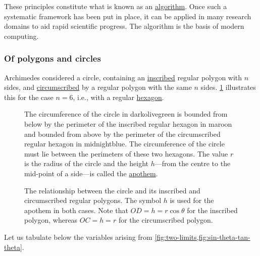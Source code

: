 \documentclass[
  a4paper,
]{article}
\begin{document}
These principles constitute what is known as an
\href{https://www.merriam-webster.com/dictionary/algorithm}{algorithm}.
Once such a systematic framework has been put in place, it can be
applied in many research domains to aid rapid scientific progress. The
algorithm is the basis of modern computing.

\subsubsection{Of polygons and circles}\label{of-polygons-and-circles}

Archimedes considered a circle, containing an
\href{https://mathworld.wolfram.com/Inscribed.html}{inscribed} regular
polygon with \(n\) sides, and
\href{https://mathworld.wolfram.com/Circumscribed.html}{circumscribed}
by a regular polygon with the same \(n\) sides. \cref{fig:two-limits}
illustrates this for the case \(n = 6\), i.e., with a regular
\href{https://www.britannica.com/science/hexagon}{hexagon}.

\begin{figure}
\centering

\caption{The circumference of the circle in darkolivegreen is bounded
from below by the perimeter of the inscribed regular hexagon in maroon
and bounded from above by the perimeter of the circumscribed regular
hexagon in midnightblue. The circumference of the circle must lie
between the perimeters of these two hexagons. The value \(r\) is the
radius of the circle and the height \(h\)---from the centre to the
mid-point of a side---is called the
\href{https://en.wikipedia.org/wiki/Apothem}{apothem}.}\label{fig:two-limits}
\end{figure}

\begin{figure}
\centering

\caption{The relationship between the circle and its inscribed and
circumscribed regular polygons. The symbol \(h\) is used for the apothem
in both cases. Note that \(OD = h = r\cos\theta\) for the inscribed
polygon, whereas \(OC = h = r\) for the circumscribed
polygon.}\label{fig:sin-theta-tan-theta}
\end{figure}

Let us tabulate below the variables arising from
\cref{fig:two-limits,fig:sin-theta-tan-theta}.
\end{document}

